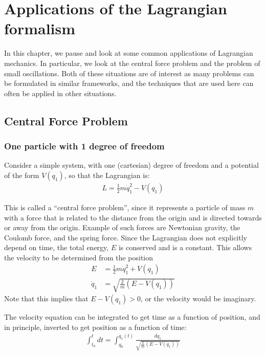 \chapter{Applications of the Lagrangian formalism}
\label{chap:LagrangianApplications}
In this chapter, we pause and look at some common applications of Lagrangian mechanics. In particular, we look at the central force problem and the problem of small oscillations. Both of these situations are of interest as many problems can be formulated in similar frameworks, and the techniques that are used here can often be applied in other situations.

\section{Central Force Problem}
\subsection{One particle with 1 degree of freedom}
Consider a simple system, with one (cartesian) degree of freedom and a potential of the form $V(q_1)$, so that the Lagrangian is:
\begin{align}
L=\frac{1}{2}m\dot{q}_1^2-V(q_1)
\end{align}

This is called a ``central force problem'', since it represents a particle of mass $m$ with a force that is related to the distance from the origin and is directed towards or away from the origin. Example of such forces are Newtonian gravity, the Coulomb force, and the spring force. Since the Lagrangian does not explicitly depend on time, the total energy, $E$ is conserved and is a constant. This allows the velocity to be determined from the position
\begin{align}
E&=\frac{1}{2}m\dot{q}_1^2+V(q_1)\nonumber\\
\dot{q}_1&=\sqrt{\frac{2}{m}(E-V(q_1))}
\label{eqn:consE1dof}
\end{align}
Note that this implies that $E-V(q_1)>0$, or the velocity would be imaginary. 

The velocity equation can be integrated to get time as a function of position, and in principle, inverted to get position as a function of time:
\begin{align}
\int_{t_0}^t dt=\int_{q_0}^{q_1(t)}\frac{dq_1}{\sqrt{\frac{2}{m}(E-V(q_1))}}
\end{align}
